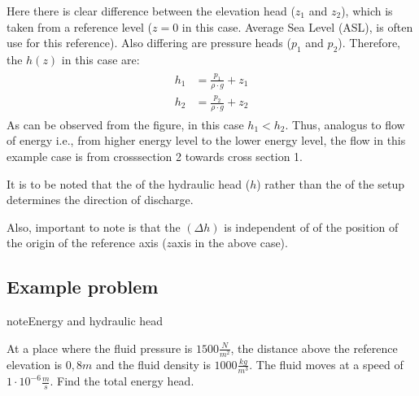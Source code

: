\documentclass[letterpaper,10pt,english]{jupyterBook}
\let\sphinxpxdimen\pdfpxdimen\else\newdimen\sphinxpxdimen
\begin{document}
\noindent{\hspace*{\fill}\sphinxincludegraphics[height=400\sphinxpxdimen]{{L4_f2}.png}\hspace*{\fill}}

\sphinxAtStartPar
Here there is clear difference between the elevation head (\(z_1\) and \(z_2\)), which is taken from a reference level (\(z=0\) in this case. Average Sea Level (ASL), is often use for this reference). Also differing are pressure heads (\(p_1\) and \(p_2\)). Therefore, the \(h(z)\) in this case are:
\begin{equation*}
\begin{split}
\begin{align}
h_1 &= \frac{p_1}{\rho \cdot g} + z_1 \\
h_2 &= \frac{p_2}{\rho \cdot g} + z_2
\end{align}
\end{split}
\end{equation*}
\sphinxAtStartPar
As can be observed from the figure, in this case \(h_1<h_2\). Thus, analogus to flow of energy \sphinxhyphen{} i.e., from higher energy level to the lower energy level, the flow in this example case is from cross\sphinxhyphen{}section 2 towards cross section 1.

\sphinxAtStartPar
It is to be noted that the  of the hydraulic head (\(h\)) rather than the  of the set\sphinxhyphen{}up determines the direction of discharge.

\sphinxAtStartPar
Also, important to note is that the  \((\Delta h)\) is independent of of the position of the origin of the reference axis  (\(z\)\sphinxhyphen{}axis in the above case).


\subsection{Example problem}
\label{\detokenize{content/flow/L4/14_darcy_law_K:example-problem}}
\begin{sphinxadmonition}{note}{Energy and hydraulic head}

\sphinxAtStartPar
At a place where the fluid pressure is \(1500 \frac{N}{m^2}\), the distance above the reference elevation is \(0,8 m\) and the fluid density is \(1000 \frac{kg}{m^3}\). The fluid moves at a speed of \(1 \cdot 10^{-6} \frac{m}{s}\). Find the total energy head.
\end{sphinxadmonition}
\end{document}
